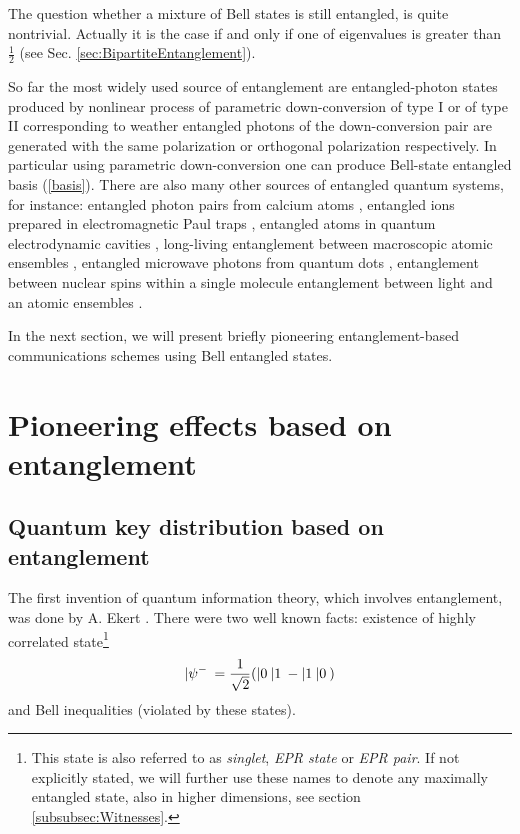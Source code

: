 \documentclass[twocolumn,aps,rmp]{revtex4}
\begin{document}
The question whether a mixture of Bell states is still entangled, is
quite nontrivial. Actually it is the case if and only if one of
eigenvalues is greater than $\frac{1}{2}$ (see
Sec. \ref{sec:BipartiteEntanglement}).

So far the most widely used source of entanglement are
entangled-photon states produced by nonlinear process of parametric
down-conversion of type I or of type II corresponding to weather
entangled photons of the down-conversion pair are generated with the
same polarization or orthogonal polarization respectively. In
particular using parametric down-conversion one can produce Bell-state
entangled basis (\ref {basis}).  There are also many other sources of
entangled quantum systems, for instance: entangled photon pairs from
calcium atoms \cite {Kocher}, entangled ions prepared in
electromagnetic Paul traps \cite {MeekhofMKIW-ion}, entangled atoms in
quantum electrodynamic cavities \cite {RaimondBH}, long-living
entanglement between macroscopic atomic ensembles \cite {PolzikJK,HaldSSP1999}, entangled microwave photons from quantum
dots \cite {EmaryTB-dot},
entanglement between nuclear spins within a single molecule \cite
{ChenHLL-nuc-spin} entanglement between light and an atomic ensembles
\cite {MuschikHPC-light}.

In the next section, we will present briefly pioneering
entanglement-based communications schemes using Bell entangled states.




\section{Pioneering effects based on entanglement}
\label{sec:effects}

\subsection{Quantum key distribution based on entanglement}
\label{subsec:Ekert}

The first invention of quantum information theory, which involves
entanglement, was done by A. Ekert \cite {E91}. There were two well
known facts: existence of highly correlated state\footnote{This state
  is also referred to as {\it singlet}, {\it EPR state} or {\it EPR
    pair}. If not explicitly stated, we will further use these names to
    denote any maximally entangled state, also in higher dimensions,
    see section \ref{subsubsec:Witnesses}.
    }
\begin{equation}
|\psi^-\> = {1\over \sqrt{2}}(|0\>|1\> - |1\>|0\>)
\label{eq:singlet_dense}
\end{equation}
and Bell inequalities (violated by these states).
\end{document}

